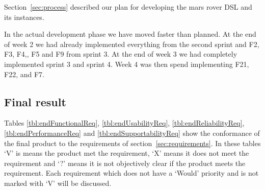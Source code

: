 Section~\ref{sec:process} described our plan for developing the mars rover
DSL and its instances. 

In the actual development phase we have moved faster than planned. At the end of
week 2 we had already implemented everything from the second sprint and F2, F3,
F4,, F5 and F9 from sprint 3. At the end of week 3 we had completely implemented
sprint 3 and sprint 4. Week 4 was then spend implementing F21, F22, and F7. 

\subsection{Final result}
Tables \ref{tbl:endFunctionalReq}, \ref{tbl:endUsabilityReq},
\ref{tbl:endReliabilityReq}, \ref{tbl:endPerformanceReq} 
and \ref{tbl:endSupportabilityReq} show the conformance of the final product to
the requirements of section~\ref{sec:requirements}. In these tables `V' is means
the product met the requirement, `X' means it does not meet the requirement and
`?' means it is not objectively clear if the product meets the requirement. 
Each requirement which does not have a `Would' priority and is not marked with
`V' will be discussed.

